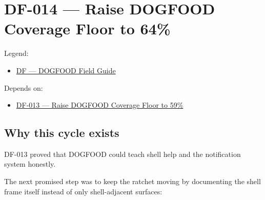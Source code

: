 \chapter{DF-014 --- Raise DOGFOOD Coverage Floor to 64\%}\label{record-076}

\smallskip

Legend:

\begin{itemize}
\tightlist
\item
  \href{https://github.com/flyingrobots/bijou/blob/1853ad902f6bf219326409e7f743a5a1d6517dbc/docs/legends/DF-dogfood-field-guide.md}{DF --- DOGFOOD Field Guide}
\end{itemize}

Depends on:

\begin{itemize}
\tightlist
\item
  \href{https://github.com/flyingrobots/bijou/blob/cbd70612140e7a450d764b3c7be1c6af878b99bc/docs/design/DF-013-raise-dogfood-coverage-floor-to-59-percent.md}{DF-013 --- Raise DOGFOOD Coverage Floor to 59\%}
\end{itemize}

\section{Why this cycle exists}\label{record-076-why-this-cycle-exists}

DF-013 proved that DOGFOOD could teach shell help and the notification system honestly.

The next promised step was to keep the ratchet moving by documenting the shell frame itself instead of only shell-adjacent surfaces:

